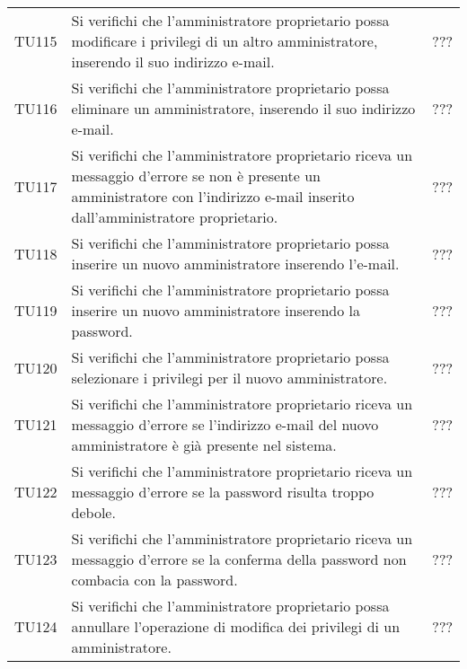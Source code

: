 {\begin{longtable}{ c C{13cm} C{1cm}}
TU115 & Si verifichi che l’amministratore proprietario possa modificare i privilegi di un altro amministratore, inserendo il suo indirizzo e-mail. & ??? \\
TU116 & Si verifichi che l’amministratore proprietario possa eliminare un amministratore, inserendo il suo indirizzo e-mail. & ??? \\
TU117 & Si verifichi che l’amministratore proprietario riceva un messaggio d'errore se non è presente un amministratore con l'indirizzo e-mail inserito dall'amministratore proprietario. & ??? \\
TU118 & Si verifichi che l’amministratore proprietario possa inserire un nuovo amministratore inserendo l’e-mail. & ??? \\
TU119 & Si verifichi che l’amministratore proprietario possa inserire un nuovo amministratore inserendo la password. & ??? \\
TU120 & Si verifichi che l’amministratore proprietario possa selezionare i privilegi per il nuovo amministratore. & ??? \\
TU121 & Si verifichi che l’amministratore proprietario riceva un messaggio d'errore se l'indirizzo e-mail del nuovo amministratore è già presente nel sistema. & ??? \\
TU122 & Si verifichi che l’amministratore proprietario riceva un messaggio d'errore se la password risulta troppo debole. & ??? \\
TU123 & Si verifichi che l’amministratore proprietario riceva un messaggio d'errore se la conferma della password non combacia con la password. & ??? \\
TU124 & Si verifichi che l’amministratore proprietario possa annullare l'operazione di modifica dei privilegi di un amministratore.  & ??? \\
\end{longtable}
}